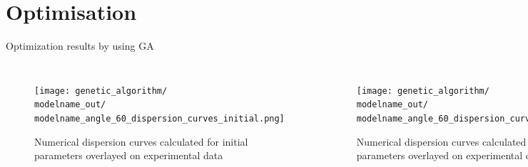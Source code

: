 \documentclass[10pt,aspectratio=169]{beamer} %
\begin{document}
\section{Optimisation}
\begin{frame}[t,label=frame23]{Optimization results by using GA}
\begin{columns}[T]
	\begin{figure} [h!]
		\newcommand{\modelname}{ga_plain_weave_known_mass}
			\texttt{[image: genetic\_algorithm/\\modelname\_out/\\modelname\_angle\_60\_dispersion\_curves\_initial.png]}
			\caption{Numerical dispersion curves calculated for initial parameters overlayed on experimental data}
		\label{fig:dispersion60deg_initial_}
	\end{figure}
	\begin{figure} [h!]
		\newcommand{\modelname}{ga_plain_weave_known_mass}
		\texttt{[image: genetic\_algorithm/\\modelname\_out/\\modelname\_angle\_60\_dispersion\_curves\_test\_case\_2.png]}
		\caption{Numerical dispersion curves calculated for optimised parameters overlayed on experimental data}
		\label{fig:dispersion60deg_optimized}
	\end{figure}
\end{columns}
	
\end{frame}


\end{document}
